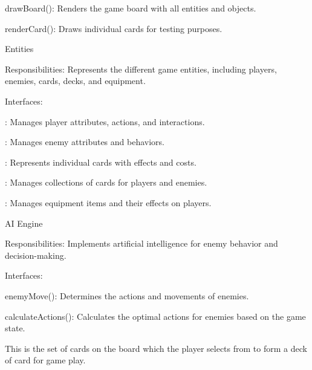 \begin{DoxyEnumerate}
\begin{DoxyItemize}
\begin{DoxyItemize}
\item draw\+Board()\+: Renders the game board with all entities and objects.
\item render\+Card()\+: Draws individual cards for testing purposes.
\end{DoxyItemize}
\end{DoxyItemize}
\item Entities
\begin{DoxyItemize}
\item Responsibilities\+: Represents the different game entities, including players, enemies, cards, decks, and equipment.
\item Interfaces\+:
\begin{DoxyItemize}
\item {}\+: Manages player attributes, actions, and interactions.
\item {}\+: Manages enemy attributes and behaviors.
\item {}\+: Represents individual cards with effects and costs.
\item {}\+: Manages collections of cards for players and enemies.
\item {}\+: Manages equipment items and their effects on players.
\end{DoxyItemize}
\end{DoxyItemize}
\item AI Engine
\begin{DoxyItemize}
\item Responsibilities\+: Implements artificial intelligence for enemy behavior and decision-\/making.
\item Interfaces\+:
\begin{DoxyItemize}
\item enemy\+Move()\+: Determines the actions and movements of enemies.
\item calculate\+Actions()\+: Calculates the optimal actions for enemies based on the game state.
\end{DoxyItemize}
\end{DoxyItemize}
\item {}
\begin{DoxyItemize}
\item This is the set of cards on the board which the player selects from to form a deck of card for game play.
\end{DoxyItemize}
\item {}

\end{DoxyEnumerate}
